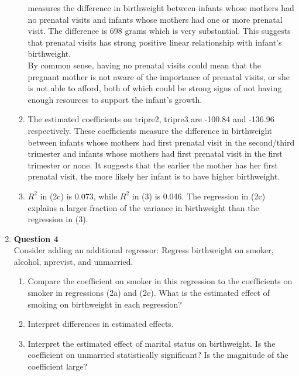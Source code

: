 \documentclass{uofa-eng-assignment}
\begin{document}
\begin{enumerate}
\begin{enumerate}
                  measures the difference in birthweight between infants whose mothers had no
                  prenatal visits and infants whose mothers had one or more prenatal visit. The
                  difference is 698 grams which is very substantial. This suggests that prenatal
                  visits has strong positive linear relationship with infant's birthweight. \\ By
                  common sense, having no prenatal visits could mean that the pregnant mother is
                  not aware of the importance of prenatal visits, or she is not able to afford,
                  both of which could be strong signs of not having enough resources to support
                  the infant's growth.
            \item The estimated coefficients on tripre2, tripre3 are -100.84 and -136.96
                  respectively. These coefficients measure the difference in birthweight between
                  infants whose mothers had first prenatal visit in the second/third trimester
                  and infants whose mothers had first prenatal visit in the first trimester or
                  none. It suggests that the earlier the mother has her first prenatal visit, the
                  more likely her infant is to have higher birthweight.
            \item $R^2$ in (2c) is 0.073, while $R^2$ in (3) is 0.046. The regression in (2c)
                  explains a larger fraction of the variance in birthweight than the regression
                  in (3).
        \end{enumerate}
    \item[] \textbf{Question 4} \\
        Consider adding an additional regressor: Regress birthweight on smoker, alcohol, nprevist, and
        unmarried.
        \begin{enumerate}
            \item Compare the coefficient on smoker in this regression to the coefficients on
                  smoker in regressions (2a) and (2c). What is the estimated effect of smoking on
                  birthweight in each regression?
            \item Interpret differences in estimated effects.
            \item Interpret the estimated effect of marital status on birthweight. Is the
                  coefficient on unmarried statistically significant? Is the magnitude of the
                  coefficient large?

\end{enumerate}
\end{enumerate}
\end{document}
